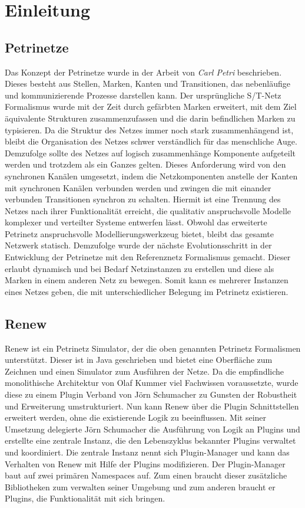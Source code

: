 \chapter{Einleitung}

\section{Petrinetze} 
Das Konzept der Petrinetze wurde in der Arbeit von \textit{Carl Petri} beschrieben. 
Dieses besteht aus Stellen, Marken, Kanten und Transitionen, das nebenläufige und kommunizierende Prozesse darstellen kann.
Der ursprüngliche S/T-Netz Formalismus wurde mit der Zeit durch gefärbten Marken erweitert, mit dem Ziel äquivalente Strukturen zusammenzufassen und die darin befindlichen Marken zu typisieren.
Da die Struktur des Netzes immer noch stark zusammenhängend ist, bleibt die Organisation des Netzes schwer verständlich für das menschliche Auge. \newline 
Demzufolge sollte des Netzes auf logisch zusammenhänge Komponente aufgeteilt werden und trotzdem als ein Ganzes gelten.
Dieses Anforderung wird von den synchronen Kanälen umgesetzt, indem die Netzkomponenten anstelle der Kanten mit synchronen Kanälen verbunden werden und zwingen die mit einander verbunden Transitionen synchron zu schalten.
Hiermit ist eine Trennung des Netzes nach ihrer Funktionalität erreicht, die qualitativ anspruchsvolle Modelle komplexer und verteilter Systeme entwerfen lässt.\bigbreak
Obwohl das erweiterte Petrinetz anspruchsvolle Modellierungswerkzeug bietet, bleibt das gesamte Netzwerk statisch.
Demzufolge wurde der nächste Evolutionsschritt in der Entwicklung der Petrinetze mit den Referenznetz Formalismus gemacht. 
Dieser erlaubt dynamisch und bei Bedarf Netzinstanzen zu erstellen und diese als Marken in einem anderen Netz zu bewegen. 
Somit kann es mehrerer Instanzen eines Netzes geben, die mit unterschiedlicher Belegung im Petrinetz existieren. 

\section{Renew} 
Renew ist ein Petrinetz Simulator, der die oben genannten Petrinetz Formalismen unterstützt. Dieser ist in Java geschrieben und bietet eine Oberfläche zum Zeichnen und einen Simulator zum Ausführen der Netze. \newline 
Da die empfindliche monolithische Architektur von Olaf Kummer viel Fachwissen voraussetzte, wurde diese zu einem Plugin Verband von Jörn Schumacher zu Gunsten der Robustheit und Erweiterung umstrukturiert. Nun kann Renew über die Plugin Schnittstellen erweitert werden, ohne die existierende Logik zu beeinflussen. \bigbreak
Mit seiner Umsetzung delegierte Jörn Schumacher die Ausführung von Logik an Plugins und erstellte eine zentrale Instanz, die den Lebenszyklus bekannter Plugins verwaltet und koordiniert. Die zentrale Instanz nennt sich Plugin-Manager und kann das Verhalten von Renew mit Hilfe der Plugins modifizieren.
Der Plugin-Manager baut auf zwei primären Namespaces auf. Zum einen braucht dieser zusätzliche Bibliotheken zum verwalten seiner Umgebung und zum anderen braucht er Plugins, die Funktionalität mit sich bringen. 
\bigbreak 

